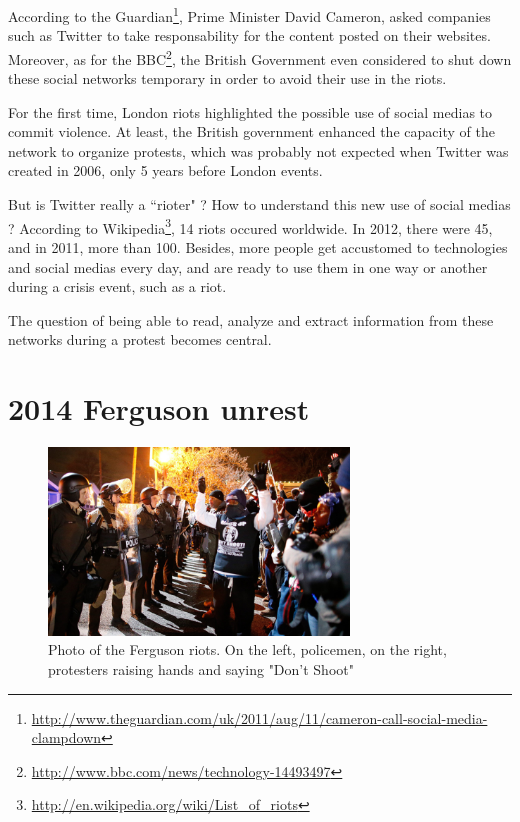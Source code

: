 \documentclass[a4paper,twoside,12pt,openright]{report}
\begin{document}
According to the Guardian\footnote{\url{http://www.theguardian.com/uk/2011/aug/11/cameron-call-social-media-clampdown}}, Prime Minister David Cameron, asked companies such as Twitter to take responsability for the content posted on their websites. Moreover, as for the BBC\footnote{\url{http://www.bbc.com/news/technology-14493497}}, the British Government even considered to shut down these social networks temporary in order to avoid their use in the riots. 

For the first time, London riots highlighted the possible use of social medias to commit violence. At least, the British government enhanced the capacity of the network to organize protests, which was probably not expected when Twitter was created in 2006, only 5 years before London events. 

But is Twitter really a ``rioter" ? How to understand this new use of social medias ? According to Wikipedia\footnote{\url{http://en.wikipedia.org/wiki/List_of_riots}}, 14 riots occured worldwide. In 2012, there were 45, and in 2011, more than 100. Besides, more people get accustomed to technologies and social medias every day, and are ready to use them in one way or another during a crisis event, such as a riot. 

The question of being able to read, analyze and extract information from these networks during a protest becomes central.

\newpage

\section{2014 Ferguson unrest}

\begin{figure}
\vspace{-0.5cm}
\centering
\includegraphics[width=8cm]{images/photos/ferguson_riots.jpg}
\caption{Photo of the Ferguson riots. On the left, policemen, on the right, protesters raising hands and saying "Don't Shoot"}
\vspace*{-1cm}
\end{figure}
\end{document}
